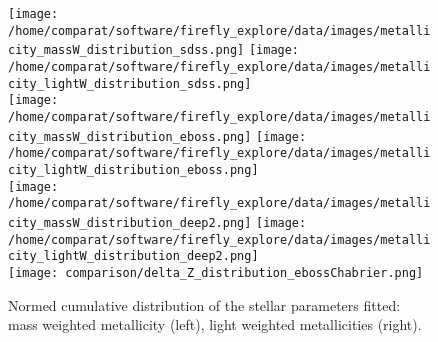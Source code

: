 \documentclass[onecolumn]{aa}
\begin{document}
\begin{figure}
\begin{center}
\caption{\label{fig:distributions:MwZ} 
Normed cumulative distribution of the stellar parameters fitted: mass weighted metallicity (left), light weighted metallicities (right).}  
\texttt{[image: /home/comparat/software/firefly\_explore/data/images/metallicity\_massW\_distribution\_sdss.png]}
\texttt{[image: /home/comparat/software/firefly\_explore/data/images/metallicity\_lightW\_distribution\_sdss.png]}    \\
\texttt{[image: /home/comparat/software/firefly\_explore/data/images/metallicity\_massW\_distribution\_eboss.png]}
\texttt{[image: /home/comparat/software/firefly\_explore/data/images/metallicity\_lightW\_distribution\_eboss.png]}     \\
\texttt{[image: /home/comparat/software/firefly\_explore/data/images/metallicity\_massW\_distribution\_deep2.png]}
\texttt{[image: /home/comparat/software/firefly\_explore/data/images/metallicity\_lightW\_distribution\_deep2.png]} \\
\texttt{[image: comparison/delta\_Z\_distribution\_ebossChabrier.png]}

\end{center}
\end{figure}
% 
\end{document}
